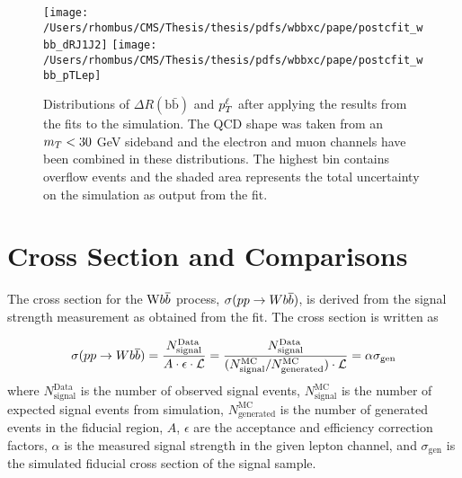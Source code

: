 \begin{figure}[!htb]
\caption[Fitted $\Delta R(b\overline{b})$ and $\pt^\ell$ in the \wbb signal region]{
  Distributions of $\Delta R(\mathrm{b\bar{b}})$ and $\pt^\ell$ after
   applying the results from the fits to the simulation.
  The QCD shape was taken from an $m_T<30$ GeV sideband and the
   electron and muon channels have been combined in these distributions.
  The highest bin contains overflow events and
   the shaded area represents the total uncertainty on the simulation as output from the fit.
 }
\center
\texttt{[image: /Users/rhombus/CMS/Thesis/thesis/pdfs/wbbxc/pape/postcfit\_wbb\_dRJ1J2]}
\texttt{[image: /Users/rhombus/CMS/Thesis/thesis/pdfs/wbbxc/pape/postcfit\_wbb\_pTLep]}
\label{fig:postfit_drbb_ptl}
\end{figure}

\section{Cross Section and Comparisons}

The cross section for the $\mathrm{W} b\overline{b}$ process,
 $\sigma(pp\rightarrow Wb\overline{b})$,
 is derived from the signal strength measurement as obtained from the fit.
The cross section is written as

$$\sigma(pp\rightarrow Wb\overline{b}) = 
\frac{N^{\mathrm{Data}}_{\mathrm{signal}}}{A\cdot\epsilon\cdot \mathcal{L}} = 
\frac{N^{\mathrm{Data}}_{\mathrm{signal}}}{(N^{\mathrm{MC}}_{\mathrm{signal}}/N^{\mathrm{MC}}_{\mathrm{generated}})\cdot \mathcal{L}} =
\alpha \sigma_{\mathrm{gen}}$$
 where
 $N^{\mathrm{Data}}_{\mathrm{signal}}$ is the number of observed signal events,
 $N^{\mathrm{MC}}_{\mathrm{signal}}$ is the number of expected signal events from simulation,
 $N^{\mathrm{MC}}_{\mathrm{generated}}$ is the number of generated events in the fiducial region,
 $A$, $\epsilon$ are the acceptance and efficiency correction factors,
 $\alpha$ is the measured signal strength in the given lepton channel, and
 $\sigma_{\mathrm{gen}}$ is the simulated fiducial cross section of the signal sample.


